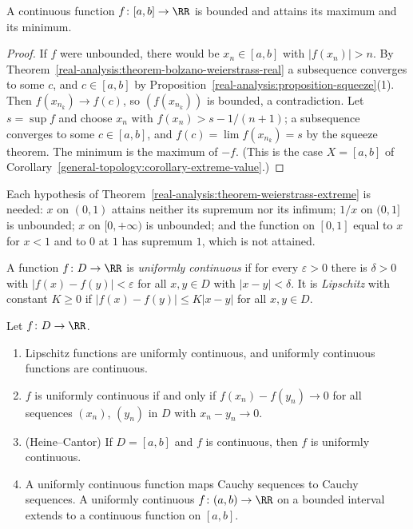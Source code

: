 \begin{theorem}[Weierstrass]\label{real-analysis:theorem-weierstrass-extreme}
A continuous function $f \colon [a, b] \to \RR$ is bounded and attains its maximum and its minimum.
\end{theorem}

\begin{proof}
If $f$ were unbounded, there would be $x_n \in [a, b]$ with $|f(x_n)| > n$. By Theorem~\ref{real-analysis:theorem-bolzano-weierstrass-real} a subsequence converges to some $c$, and $c \in [a, b]$ by
Proposition~\ref{real-analysis:proposition-squeeze}(1). Then $f(x_{n_k}) \to f(c)$, so $(f(x_{n_k}))$ is bounded, a contradiction. Let $s = \sup f$ and choose $x_n$ with $f(x_n) > s - 1/(n + 1)$; a subsequence converges to
some $c \in [a, b]$, and $f(c) = \lim f(x_{n_k}) = s$ by the squeeze theorem. The minimum is the maximum of $-f$. (This is the case $X = [a, b]$ of Corollary~\ref{general-topology:corollary-extreme-value}.)
\end{proof}

\begin{counterexample}\label{real-analysis:counterexample-extreme-value}
Each hypothesis of Theorem~\ref{real-analysis:theorem-weierstrass-extreme} is needed: $x$ on $(0, 1)$ attains neither its supremum nor its infimum; $1/x$ on $(0, 1]$ is unbounded; $x$ on $[0, +\infty)$ is
unbounded; and the function on $[0, 1]$ equal to $x$ for $x < 1$ and to $0$ at $1$ has supremum $1$, which is not attained.
\end{counterexample}

\begin{definition}\label{real-analysis:definition-uniform-continuity-real}
A function $f \colon D \to \RR$ is \emph{uniformly continuous} if for every $\varepsilon > 0$ there is $\delta > 0$ with $|f(x) - f(y)| < \varepsilon$ for all $x, y \in D$ with $|x - y| < \delta$. It is
\emph{Lipschitz} with constant $K \geq 0$ if $|f(x) - f(y)| \leq K|x - y|$ for all $x, y \in D$.
\end{definition}

\begin{proposition}\label{real-analysis:proposition-uniform-continuity-real}
Let $f \colon D \to \RR$.
\begin{enumerate}
\item Lipschitz functions are uniformly continuous, and uniformly continuous functions are continuous.
\item $f$ is uniformly continuous if and only if $f(x_n) - f(y_n) \to 0$ for all sequences $(x_n)$, $(y_n)$ in $D$ with $x_n - y_n \to 0$.
\item (Heine--Cantor) If $D = [a, b]$ and $f$ is continuous, then $f$ is uniformly continuous.
\item A uniformly continuous function maps Cauchy sequences to Cauchy sequences. A uniformly continuous $f \colon (a, b) \to \RR$ on a bounded interval extends to a continuous function on $[a, b]$.
\end{enumerate}
\end{proposition}

